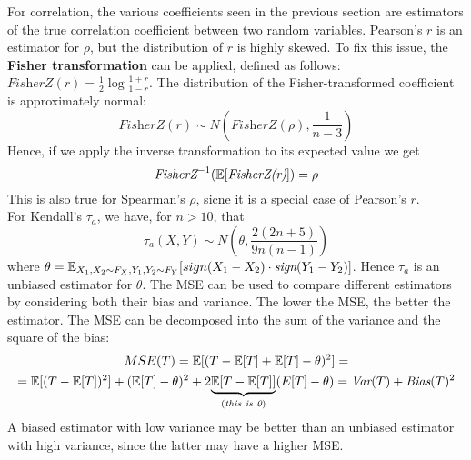 For correlation, the various coefficients seen in the previous section are estimators of the true correlation coefficient between two random variables. Pearson's $r$ is an estimator for $\rho$, but the distribution of $r$ is highly skewed. To fix this issue, the \textbf{Fisher transformation} can be applied, defined as follows: $\textit{FisherZ}(r) = \frac{1}{2} \log\frac{1+r}{1-r}$. The distribution of the Fisher-transformed coefficient is approximately normal:
\begin{equation*}
    \textit{FisherZ}(r) \sim N\left(\textit{FisherZ}(\rho), \frac{1}{n-3}\right)
\end{equation*}   
Hence, if we apply the inverse transformation to its expected value we get
\begin{equation*}
    \textit{FisherZ}^{-1} (\mathbb{E}[\textit{FisherZ(r)}]) = \rho
\end{equation*}   
This is also true for Spearman's $\rho$, sicne it is a special case of Pearson's $r$. \\
For Kendall's $\tau_a$, we have, for $n > 10$, that
\begin{equation*}
    \tau_a (X,Y) \sim N\left(\theta, \frac{2(2n + 5)}{9n(n-1)}\right)
\end{equation*}   
where $\theta = \mathbb{E}_{X_1,X_2 \sim F_X, Y_1, Y_2 \sim F_Y}[sign(X_1 - X_2) \cdot \textit{sign}(Y_1 - Y_2)]$. Hence $\tau_a$ is an unbiased estimator for $\theta$.
The MSE can be used to compare different estimators by considering both their bias and variance. The lower the MSE, the better the estimator. The MSE can be decomposed into the sum of the variance and the square of the bias:
\begin{gather*}
    MSE(T) = \mathbb{E}[(T - \mathbb{E}[T] + \mathbb{E}[T] - \theta)^2] =\\
    = \mathbb{E}[(T - \mathbb{E}[T])^2] + (\mathbb{E}[T] - \theta)^2 + 2\underset{(\textit{this is 0})}{\underbrace{{\mathbb{E}[T - \mathbb{E}[T]]}}}(E[T]- \theta) = \textit{Var}(T) + \textit{Bias}(T)^2
\end{gather*}
A biased estimator with low variance may be better than an unbiased estimator with high variance, since the latter may have a higher MSE.

